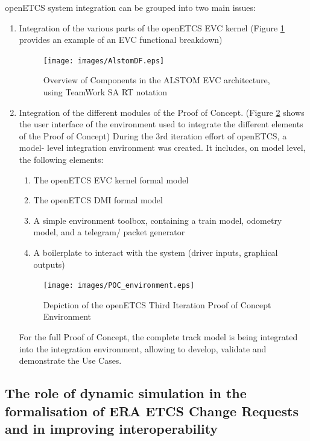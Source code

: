 \documentclass{template/openetcs_article}
\begin{document}
openETCS system integration can be grouped into two main issues:
\begin{enumerate}
 \item Integration of the various parts of the openETCS EVC kernel (Figure \ref{fig:Alstom1} provides an example of an EVC functional breakdown)
\begin{figure}[H]
  \centering
  \texttt{[image: images/AlstomDF.eps]}
  \caption{Overview of Components in the ALSTOM EVC architecture, using TeamWork SA RT notation}
  \label{fig:Alstom1}
\end{figure}
 \item Integration of the different modules of the Proof of Concept. (Figure \ref{fig:POC} shows the user interface of the environment used to integrate the different elements of the Proof of Concept)
During the 3rd iteration effort of openETCS, a model- level integration environment was created. It includes, on model level, the following elements:
\begin{enumerate}
 \item The openETCS EVC kernel formal model
 \item The openETCS DMI formal model
 \item A simple environment toolbox, containing a train model, odometry model, and a telegram/ packet generator
 \item A boilerplate to interact with the system (driver inputs, graphical outputs)
\end{enumerate}
 \begin{figure}[H]
  \centering
  \texttt{[image: images/POC\_environment.eps]}
  \caption{Depiction of the openETCS Third Iteration Proof of Concept Environment}
  \label{fig:POC}
\end{figure}
For the full Proof of Concept, the complete track model is being integrated into the integration environment, allowing to develop, validate and demonstrate the Use Cases.
\end{enumerate}



\subsection{The role of dynamic simulation in the formalisation of ERA ETCS Change Requests and in improving interoperability}
\end{document}
